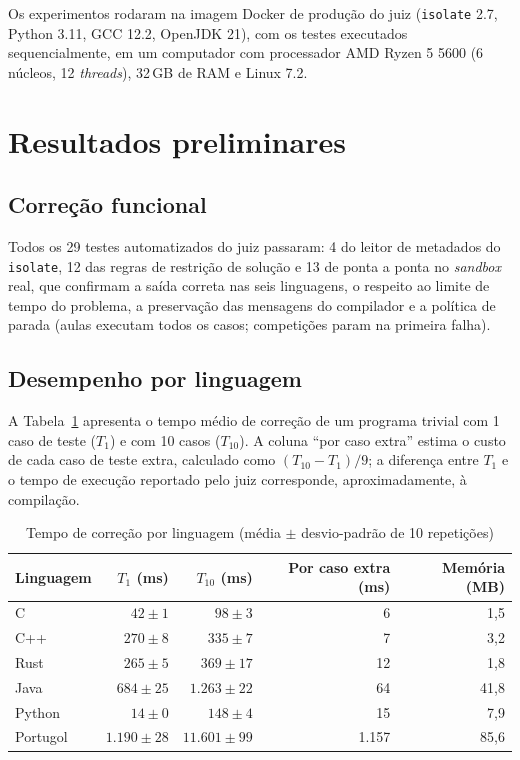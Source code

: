\documentclass[12pt]{article}
\begin{document}
Os experimentos rodaram na imagem Docker de produção do juiz (\texttt{isolate} 2.7, Python 3.11, GCC 12.2, OpenJDK 21), com os testes executados sequencialmente, em um computador com processador AMD Ryzen 5 5600 (6 núcleos, 12 \emph{threads}), 32\,GB de RAM e Linux 7.2.

\section{Resultados preliminares}\label{sec:resultados}

\subsection{Correção funcional}

Todos os 29 testes automatizados do juiz passaram: 4 do leitor de metadados do \texttt{isolate}, 12 das regras de restrição de solução e 13 de ponta a ponta no \emph{sandbox} real, que confirmam a saída correta nas seis linguagens, o respeito ao limite de tempo do problema, a preservação das mensagens do compilador e a política de parada (aulas executam todos os casos; competições param na primeira falha).

\subsection{Desempenho por linguagem}

A Tabela~\ref{tab:desempenho} apresenta o tempo médio de correção de um programa trivial com 1 caso de teste ($T_1$) e com 10 casos ($T_{10}$). A coluna ``por caso extra'' estima o custo de cada caso de teste extra, calculado como $(T_{10} - T_1)/9$; a diferença entre $T_1$ e o tempo de execução reportado pelo juiz corresponde, aproximadamente, à compilação.

\begin{table}[!htb]
\centering
\caption{Tempo de correção por linguagem (média $\pm$ desvio-padrão de 10 repetições)}
\label{tab:desempenho}
\small
\begin{tabular}{|l|r|r|r|r|}
\hline
\textbf{Linguagem} & $T_1$ (ms) & $T_{10}$ (ms) & \textbf{Por caso extra} (ms) & \textbf{Memória} (MB) \\
\hline
C        & $42 \pm 1$      & $98 \pm 3$       & 6     & 1,5 \\
C++      & $270 \pm 8$     & $335 \pm 7$      & 7     & 3,2 \\
Rust     & $265 \pm 5$     & $369 \pm 17$     & 12    & 1,8 \\
Java     & $684 \pm 25$    & $1.263 \pm 22$   & 64    & 41,8 \\
Python   & $14 \pm 0$      & $148 \pm 4$      & 15    & 7,9 \\
Portugol & $1.190 \pm 28$  & $11.601 \pm 99$  & 1.157 & 85,6 \\
\hline
\end{tabular}
\end{table}
\end{document}
